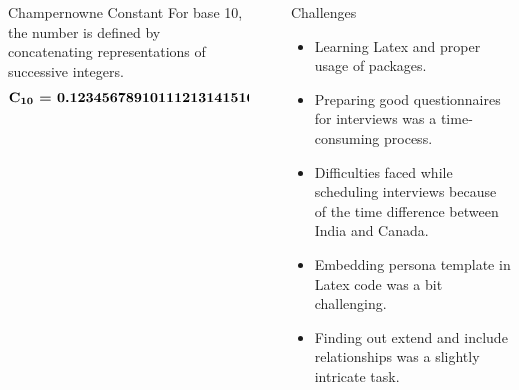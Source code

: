 \documentclass[final]{beamer}
\newlength{\sepwid}
\newlength{\onecolwid}
\newlength{\twocolwid}
\begin{document}
\begin{frame}[t]
\begin{columns}[t]
\begin{column}{\twocolwid}
\begin{columns}[t,totalwidth=\twocolwid]
\begin{column}{\onecolwid}
\vspace{2cm}


\end{column} %

\end{columns} %



\begin{alertblock}{Champernowne Constant}
For base 10, the number is defined by concatenating representations of successive integers.
\[ \textbf{C\textsubscript{10} = 0.12345678910111213141516...} \]

\end{alertblock} 


\end{column} %

\begin{column}{\sepwid}\end{column} %

\begin{column}{\onecolwid} %


\begin{block}{Challenges}

\begin{itemize}
\item Learning Latex and proper usage of packages.
\item Preparing good questionnaires for interviews was a time-consuming process.
\item Difficulties faced while scheduling interviews because of the time difference between India and Canada.
\item Embedding persona template in Latex code was a bit challenging.
\item Finding out extend and include relationships was a slightly intricate task.
\end{itemize}


\end{block}
\end{column}
\end{columns}
\end{frame}
\end{document}
